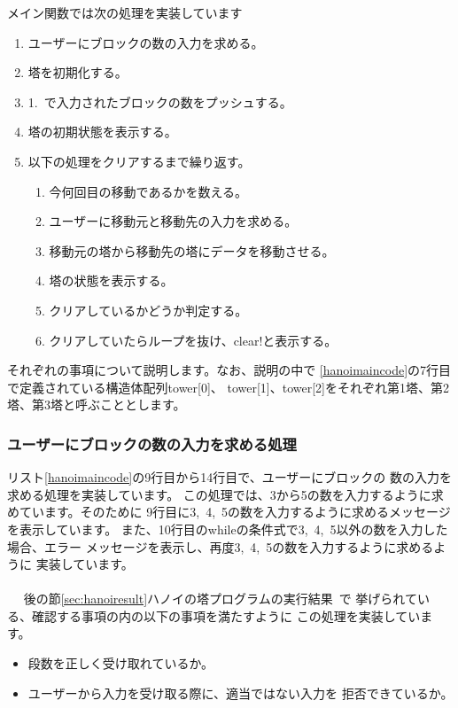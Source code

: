 \documentclass[a4j]{jarticle}
\begin{document}
メイン関数では次の処理を実装しています
\begin{enumerate}
  \item ユーザーにブロックの数の入力を求める。
  \item 塔を初期化する。
  \item 1.~で入力されたブロックの数をプッシュする。
  \item 塔の初期状態を表示する。
  \item 以下の処理をクリアするまで繰り返す。
        \begin{enumerate}
          \item 今何回目の移動であるかを数える。
          \item ユーザーに移動元と移動先の入力を求める。
          \item 移動元の塔から移動先の塔にデータを移動させる。
          \item 塔の状態を表示する。
          \item クリアしているかどうか判定する。
          \item クリアしていたらループを抜け、clear!と表示する。
        \end{enumerate}
\end{enumerate}

それぞれの事項について説明します。なお、説明の中で
\ref{hanoimaincode}の7行目で定義されている構造体配列tower[0]、
tower[1]、tower[2]をそれぞれ第1塔、第2塔、第3塔と呼ぶこととします。

\subsubsection{ユーザーにブロックの数の入力を求める処理}
\label{sec:blockinput}
リスト\ref{hanoimaincode}の9行目から14行目で、ユーザーにブロックの
数の入力を求める処理を実装しています。
この処理では、3から5の数を入力するように求めています。そのために
9行目に3,~4,~5の数を入力するように求めるメッセージを表示しています。
また、10行目のwhileの条件式で3,~4,~5以外の数を入力した場合、エラー
メッセージを表示し、再度3,~4,~5の数を入力するように求めるように
実装しています。
\\\\~~
後の節\ref{sec:hanoiresult}ハノイの塔プログラムの実行結果~で
挙げられている、確認する事項の内の以下の事項を満たすように
この処理を実装しています。
\begin{itemize}
  \item 段数を正しく受け取れているか。
  \item ユーザーから入力を受け取る際に、適当ではない入力を
        拒否できているか。
\end{itemize}
\end{document}
